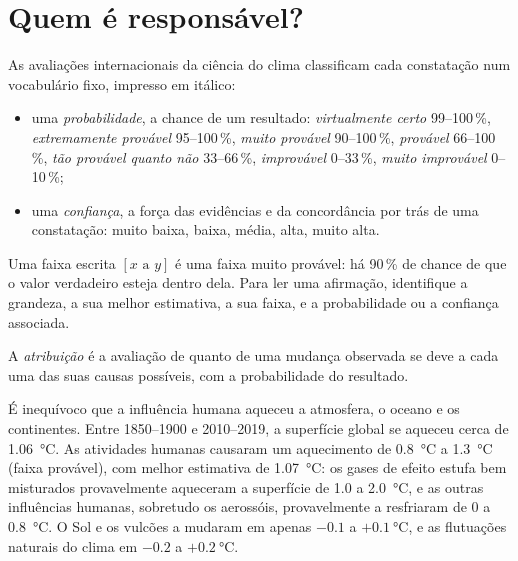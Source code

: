 \section{Quem é responsável?}

\begin{method}\label{met:g12:climate-change:language}
As avaliações internacionais da ciência do clima classificam cada
constatação num vocabulário fixo, impresso em itálico:
\begin{itemize}
  \item uma \emph{probabilidade}, a chance de um resultado:
        \emph{virtualmente certo} 99--100\,\%, \emph{extremamente provável}
        95--100\,\%, \emph{muito provável} 90--100\,\%, \emph{provável}
        66--100\,\%, \emph{tão provável quanto não} 33--66\,\%,
        \emph{improvável} 0--33\,\%, \emph{muito improvável} 0--10\,\%;
  \item uma \emph{confiança}, a força das evidências e da concordância por
        trás de uma constatação: muito baixa, baixa, média, alta, muito alta.
\end{itemize}
Uma faixa escrita $[x \text{ a } y]$ é uma faixa muito provável: há 90\,\%
de chance de que o valor verdadeiro esteja dentro dela. Para ler uma
afirmação, identifique a grandeza, a sua melhor estimativa, a sua faixa, e a
probabilidade ou a confiança associada.
\end{method}

\begin{definition}[Atribuição]\label{def:g12:climate-change:attribution}
A \emph{atribuição} é a avaliação de quanto de
uma mudança observada se deve a cada uma das suas causas possíveis, com a
probabilidade do resultado.
\end{definition}

\begin{proposition}\label{prop:g12:climate-change:attribution}
É inequívoco que a influência humana aqueceu a atmosfera, o oceano e os
continentes. Entre 1850--1900 e 2010--2019, a superfície global se aqueceu
cerca de \qty{1.06}{\degreeCelsius}. As atividades humanas causaram um
aquecimento de \qty{0.8}{\degreeCelsius} a \qty{1.3}{\degreeCelsius} (faixa
provável), com melhor estimativa de \qty{1.07}{\degreeCelsius}: os gases de
efeito estufa bem misturados provavelmente aqueceram a superfície de 1.0 a
\qty{2.0}{\degreeCelsius}, e as outras influências humanas, sobretudo os
aerossóis, provavelmente a resfriaram de 0 a \qty{0.8}{\degreeCelsius}. O
Sol e os vulcões a mudaram em apenas $-0.1$
a $+\qty{0.1}{\degreeCelsius}$, e as flutuações naturais do clima
em $-0.2$ a $+\qty{0.2}{\degreeCelsius}$.
\end{proposition}

